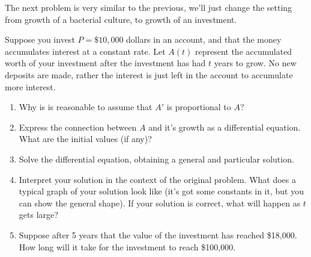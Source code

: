 The next problem is very similar to the previous, we'll just change the setting from growth of a bacterial culture, to growth of an investment.
\begin{problem}
 Suppose you invest $P=\$10,000$ dollars in an account, and that the money accumulates interest at a constant rate. Let $A(t)$ represent the accumulated worth of your investment after the investment has had $t$ years to grow. No new deposits are made, rather the interest is just left in the account to accumulate more interest.
\begin{enumerate}
 \item Why is is reasonable to assume that $A'$ is proportional to $A$?
 \item Express the connection between $A$ and it's growth as a differential equation. What are the initial values (if any)?
 \item Solve the differential equation, obtaining a general and particular solution.
 \item Interpret your solution in the context of the original problem. What does a typical graph of your solution look like (it's got some constants in it, but you can show the general shape). If your solution is correct, what will happen as $t$ gets large?
 \item Suppose after 5 years that the value of the investment has reached \$18,000.  How long will it take for the investment to reach \$100,000.
\end{enumerate}

\end{problem}


